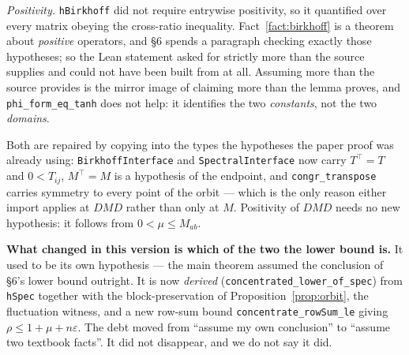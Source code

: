 \documentclass[11pt,a4paper]{article}
\theoremstyle{plain}
\theoremstyle{definition}
\begin{document}
\emph{Positivity.} \verb|hBirkhoff| did not require entrywise positivity, so it
quantified over every matrix obeying the cross-ratio inequality.
Fact~\ref{fact:birkhoff} is a theorem about \emph{positive} operators, and \S6
spends a paragraph checking exactly those hypotheses; so the Lean statement asked
for strictly more than the source supplies and could not have been built from
\cite{evesonnussbaum1995} at all. Assuming more than the source provides is the
mirror image of claiming more than the lemma proves, and
\verb|phi_form_eq_tanh| does not help: it identifies the two \emph{constants},
not the two \emph{domains}.

Both are repaired by copying into the types the hypotheses the paper proof was
already using: \verb|BirkhoffInterface| and \verb|SpectralInterface| now carry
$T^{\!\top}=T$ and $0<T_{ij}$, $M^{\!\top}=M$ is a hypothesis of the endpoint,
and \verb|congr_transpose| carries symmetry to every point of the orbit --- which
is the only reason either import applies at $DMD$ rather than only at $M$.
Positivity of $DMD$ needs no new hypothesis: it follows from $0<\mu\le M_{ab}$.

\textbf{What changed in this version is which of the two the lower bound is.} It
used to be its own hypothesis --- the main theorem assumed the conclusion of \S6's
lower bound outright. It is now \emph{derived}
(\verb|concentrated_lower_of_spec|) from \verb|hSpec| together with the
block-preservation of Proposition~\ref{prop:orbit}, the fluctuation witness, and
a new row-sum bound \verb|concentrate_rowSum_le| giving
$\rho\le 1+\mu+n\varepsilon$. The debt moved from ``assume my own conclusion'' to
``assume two textbook facts''. It did not disappear, and we do not say it did.
\end{document}
